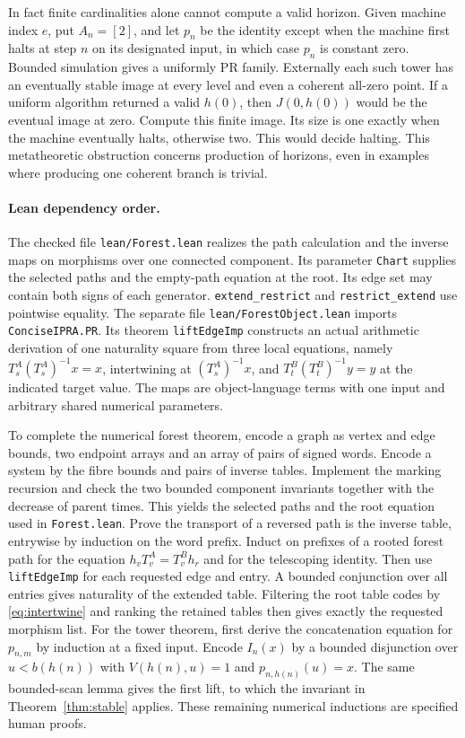 In fact finite cardinalities alone cannot compute a valid horizon. Given machine index $e$, put $A_n=[2]$, and let $p_n$ be the identity except when the machine first halts at step $n$ on its designated input, in which case $p_n$ is constant zero. Bounded simulation gives a uniformly PR family. Externally each such tower has an eventually stable image at every level and even a coherent all-zero point. If a uniform algorithm returned a valid $h(0)$, then $J(0,h(0))$ would be the eventual image at zero. Compute this finite image. Its size is one exactly when the machine eventually halts, otherwise two. This would decide halting. This metatheoretic obstruction concerns production of horizons, even in examples where producing one coherent branch is trivial.

\paragraph{Lean dependency order.}
The checked file \texttt{lean/Forest.lean} realizes the path calculation and the inverse maps on morphisms over one connected component. Its parameter \texttt{Chart} supplies the selected paths and the empty-path equation at the root. Its edge set may contain both signs of each generator. \texttt{extend\_restrict} and \texttt{restrict\_extend} use pointwise equality.
The separate file \texttt{lean/ForestObject.lean} imports \texttt{ConciseIPRA.PR}. Its theorem \texttt{liftEdgeImp} constructs an actual arithmetic derivation of one naturality square from three local equations, namely $T_s^A(T_s^A)^{-1}x=x$, intertwining at $(T_s^A)^{-1}x$, and $T_t^B(T_t^B)^{-1}y=y$ at the indicated target value. The maps are object-language terms with one input and arbitrary shared numerical parameters.

To complete the numerical forest theorem, encode a graph as vertex and edge bounds, two endpoint arrays and an array of pairs of signed words. Encode a system by the fibre bounds and pairs of inverse tables. Implement the marking recursion and check the two bounded component invariants together with the decrease of parent times. This yields the selected paths and the root equation used in \texttt{Forest.lean}. Prove the transport of a reversed path is the inverse table, entrywise by induction on the word prefix. Induct on prefixes of a rooted forest path for the equation $h_vT_v^A=T_v^Bh_r$ and for the telescoping identity. Then use \texttt{liftEdgeImp} for each requested edge and entry. A bounded conjunction over all entries gives naturality of the extended table. Filtering the root table codes by \eqref{eq:intertwine} and ranking the retained tables then gives exactly the requested morphism list. For the tower theorem, first derive the concatenation equation for $p_{n,m}$ by induction at a fixed input. Encode $I_n(x)$ by a bounded disjunction over $u<b(h(n))$ with $V(h(n),u)=1$ and $p_{n,h(n)}(u)=x$. The same bounded-scan lemma gives the first lift, to which the invariant in Theorem~\ref{thm:stable} applies. These remaining numerical inductions are specified human proofs.
